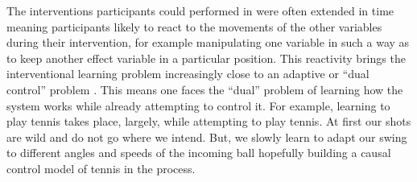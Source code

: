 \documentclass{cambridge7A}%
\def\citeapos#1{\citeauthor{#1}'s (\citeyear{#1})}
\begin{document}
The interventions participants could performed in \cite{davis2018control} were often extended in time meaning participants likely to react to the movements of the other variables during their intervention, for example manipulating one variable in such a way as to keep another effect variable in a particular position.  %
This reactivity brings the interventional learning problem increasingly close to an adaptive or ``dual control'' problem \citep{feldbaum1961dual,guez2015phd,klenske2016dual,schulz2017control}. This means one faces the ``dual'' problem of learning how the system works while already attempting to control it. For example, learning to play tennis takes place, largely, while attempting to play tennis. At first our shots are wild and do not go where we intend. But, we slowly learn to adapt our swing to different angles and speeds of the incoming ball hopefully building a causal control model of tennis in the process.  
\end{document}
